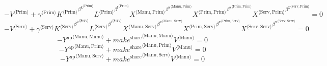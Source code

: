 \begin{equation}
-{V}^{\langle \mathrm{Prim}\rangle} + {{\gamma}^{\langle \mathrm{\mathrm{Prim}}\rangle}} {{{K}^{\langle \mathrm{Prim}\rangle}}^{{\beta^{\mathrm{k}}}^{\langle \mathrm{\mathrm{Prim}}\rangle}}} {{{L}^{\langle \mathrm{Prim}\rangle}}^{{\beta^{\mathrm{l}}}^{\langle \mathrm{\mathrm{Prim}}\rangle}}} {{{X}^{\langle \mathrm{Manu},\mathrm{Prim}\rangle}}^{{\beta^{\mathrm{x}}}^{\langle \mathrm{\mathrm{Manu}},\mathrm{\mathrm{Prim}}\rangle}}} {{{X}^{\langle \mathrm{Prim},\mathrm{Prim}\rangle}}^{{\beta^{\mathrm{x}}}^{\langle \mathrm{\mathrm{Prim}},\mathrm{\mathrm{Prim}}\rangle}}} {{{X}^{\langle \mathrm{Serv},\mathrm{Prim}\rangle}}^{{\beta^{\mathrm{x}}}^{\langle \mathrm{\mathrm{Serv}},\mathrm{\mathrm{Prim}}\rangle}}} = 0
\end{equation}
\begin{equation}
-{V}^{\langle \mathrm{Serv}\rangle} + {{\gamma}^{\langle \mathrm{\mathrm{Serv}}\rangle}} {{{K}^{\langle \mathrm{Serv}\rangle}}^{{\beta^{\mathrm{k}}}^{\langle \mathrm{\mathrm{Serv}}\rangle}}} {{{L}^{\langle \mathrm{Serv}\rangle}}^{{\beta^{\mathrm{l}}}^{\langle \mathrm{\mathrm{Serv}}\rangle}}} {{{X}^{\langle \mathrm{Manu},\mathrm{Serv}\rangle}}^{{\beta^{\mathrm{x}}}^{\langle \mathrm{\mathrm{Manu}},\mathrm{\mathrm{Serv}}\rangle}}} {{{X}^{\langle \mathrm{Prim},\mathrm{Serv}\rangle}}^{{\beta^{\mathrm{x}}}^{\langle \mathrm{\mathrm{Prim}},\mathrm{\mathrm{Serv}}\rangle}}} {{{X}^{\langle \mathrm{Serv},\mathrm{Serv}\rangle}}^{{\beta^{\mathrm{x}}}^{\langle \mathrm{\mathrm{Serv}},\mathrm{\mathrm{Serv}}\rangle}}} = 0
\end{equation}
\begin{equation}
-{Y^{\mathrm{ap}}}^{\langle \mathrm{Manu},\mathrm{Manu}\rangle} + {{{m\!a\!k\!e}^{\mathrm{share}}}^{\langle \mathrm{\mathrm{Manu}},\mathrm{\mathrm{Manu}}\rangle}} {{V}^{\langle \mathrm{Manu}\rangle}} = 0
\end{equation}
\begin{equation}
-{Y^{\mathrm{ap}}}^{\langle \mathrm{Manu},\mathrm{Prim}\rangle} + {{{m\!a\!k\!e}^{\mathrm{share}}}^{\langle \mathrm{\mathrm{Manu}},\mathrm{\mathrm{Prim}}\rangle}} {{V}^{\langle \mathrm{Manu}\rangle}} = 0
\end{equation}
\begin{equation}
-{Y^{\mathrm{ap}}}^{\langle \mathrm{Manu},\mathrm{Serv}\rangle} + {{{m\!a\!k\!e}^{\mathrm{share}}}^{\langle \mathrm{\mathrm{Manu}},\mathrm{\mathrm{Serv}}\rangle}} {{V}^{\langle \mathrm{Manu}\rangle}} = 0
\end{equation}
